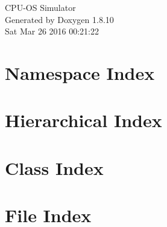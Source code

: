 \documentclass[twoside]{book}
\newcommand{\+}{\discretionary{\mbox{\scriptsize$\hookleftarrow$}}{}{}}
\newcommand{\clearemptydoublepage}{%
  \newpage{\pagestyle{empty}\cleardoublepage}%
}
\begin{document}
\hypersetup{pageanchor=false,
             bookmarks=true,
             bookmarksnumbered=true,
             pdfencoding=unicode
            }
\begin{titlepage}
\vspace*{7cm}
\begin{center}%
{\Large C\+P\+U-\/\+O\+S Simulator }\\
\vspace*{1cm}
{\large Generated by Doxygen 1.8.10}\\
\vspace*{0.5cm}
{\small Sat Mar 26 2016 00:21:22}\\
\end{center}
\end{titlepage}
\clearemptydoublepage
\tableofcontents
\clearemptydoublepage
{}
\hypersetup{pageanchor=true}

\chapter{Namespace Index}

\chapter{Hierarchical Index}

\chapter{Class Index}

\chapter{File Index}

\end{document}
